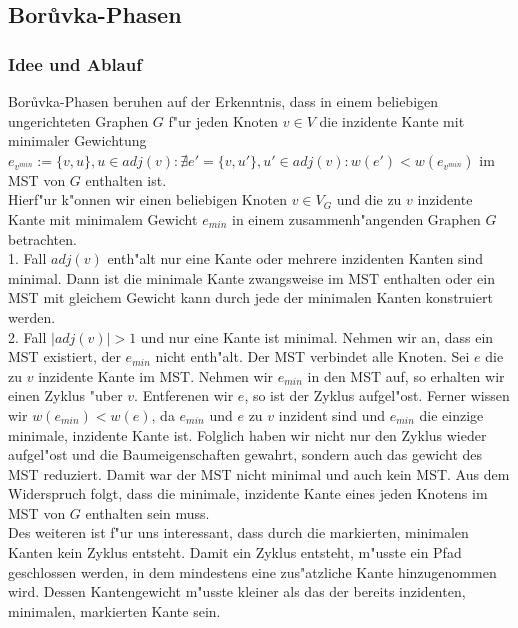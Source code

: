 \subsection{Bor\r uvka-Phasen}

\subsubsection{Idee und Ablauf}
\label{sec:borIdea}

Bor\r uvka-Phasen beruhen auf der Erkenntnis, dass in einem beliebigen 
    ungerichteten Graphen $G$ f"ur jeden Knoten $v \in V$ die inzidente Kante mit 
    minimaler Gewichtung 
    $e_{v^{min}} := \{v, u\}, u \in adj(v): 
        \nexists e' = \{v, u'\}, u' \in adj(v): w(e') < w(e_{v^{min}})$
    im MST von $G$ enthalten ist.\\
Hierf"ur k"onnen wir einen beliebigen Knoten $v \in V_G$ und die zu $v$ inzidente
    Kante mit minimalem Gewicht $e_{min}$ in einem 
    zusammenh"angenden Graphen $G$ betrachten.\\
1. Fall $adj(v)$ enth"alt nur eine Kante oder mehrere inzidenten Kanten sind minimal. 
    Dann ist die minimale Kante zwangsweise im 
    MST enthalten oder ein MST mit gleichem Gewicht kann durch jede der minimalen
    Kanten konstruiert werden.\\
2. Fall $|adj(v)| > 1$ und nur eine Kante ist minimal. 
    Nehmen wir an, dass ein MST existiert, der $e_{min}$ 
    nicht enth"alt. 
    Der MST verbindet alle Knoten.
    Sei $e$ die zu $v$ inzidente Kante im MST.
    Nehmen wir $e_{min}$ in den MST auf, so erhalten wir einen Zyklus "uber $v$.
    Entferenen wir $e$, so ist der Zyklus aufgel"ost.
    Ferner wissen wir $w(e_{min}) < w(e)$, da $e_{min}$ und $e$ zu $v$ inzident
    sind und $e_{min}$ die einzige minimale, inzidente Kante ist.
    Folglich haben wir nicht nur den Zyklus wieder aufgel"ost und die 
    Baumeigenschaften gewahrt, sondern auch das gewicht des MST reduziert.
    Damit war der MST nicht minimal und auch kein MST.
    Aus dem Widerspruch folgt, dass die minimale, inzidente Kante eines jeden
    Knotens im MST von $G$ enthalten sein muss.\\
Des weiteren ist f"ur uns interessant, dass durch die markierten, minimalen
    Kanten kein Zyklus entsteht. 
    Damit ein Zyklus entsteht, m"usste ein Pfad geschlossen werden, 
    in dem mindestens eine zus"atzliche Kante hinzugenommen wird. 
    Dessen Kantengewicht m"usste kleiner als das der bereits inzidenten, 
    minimalen, markierten Kante sein.\\
